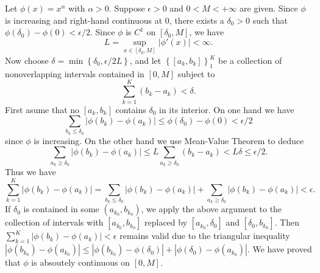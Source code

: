 \begin{exercise}{7.6}
  Let $\phi(x) = x^{\alpha}$ with $\alpha > 0$.
  Suppose $\epsilon > 0$ and $0 < M < +\infty$ are given.
  Since $\phi$ is increasing and right-hand continuous at $0$,
  there exists a $\delta_0 > 0$ such that
  $\phi(\delta_0) - \phi(0) < \epsilon/2$.
  Since $\phi$ is $C^1$ on $[\delta_0, M]$,
  we have
  \[
    L = \sup_{x \in [\delta_0, M]} \left| \phi'(x) \right| < \infty.
  \]
  Now choose $\delta = \min \left\{ \delta_0, {\epsilon}/{2 L} \right\}$,
  and let $\left\{ [a_k, b_k] \right\}_1^K$ be a collection of
  nonoverlapping intervals contained in $[0, M]$ subject to
  \[
    \sum_{k=1}^K \left(b_k - a_k\right) < \delta.
  \]
  First asume that no $[a_k, b_k]$ contains $\delta_0$ in its interior.
  On one hand we have
  \[
    \sum_{b_k \le \delta_0} \left| \phi(b_k) - \phi(a_k) \right|
    \le \phi(\delta_0) - \phi(0) < \epsilon/2
  \]
  since $\phi$ is increasing.
  On the other hand we use Mean-Value Theorem to deduce
  \[
    \sum_{a_k \ge \delta_0} \vert \phi(b_k) - \phi(a_k) \vert
    \le L \sum_{a_k \ge \delta_0} \left( b_k - a_k \right)
    < L \delta \le \epsilon/2.
  \]
  Thus we have
  \[
    \sum_{k=1}^K \left| \phi(b_k) - \phi(a_k) \right|
    = \sum_{b_k \le \delta_0} \left| \phi(b_k) - \phi(a_k) \right|
    + \sum_{a_k \ge \delta_0} \left| \phi(b_k) - \phi(a_k) \right|
    < \epsilon.
  \]
  If $\delta_0$ is contained in some $(a_{k_0}, b_{k_0})$,
  we apply the above argument to the collection of intervals
  with $[a_{k_0}, b_{k_0}]$ replaced by
  $[a_{k_0}, \delta_0]$ and $[\delta_0, b_{k_0}]$.
  Then $\sum_{k=1}^K \left| \phi(b_k) - \phi(a_k) \right| < \epsilon$
  remains valid due to the triangular inequality
  $|\phi(b_{k_0}) - \phi(a_{k_0})| \le
  |\phi(b_{k_0}) - \phi(\delta_0)| + |\phi(\delta_0) - \phi(a_{k_0})|$.
  We have proved that $\phi$ is absoutely continuous on $[0, M]$.
\end{exercise}

